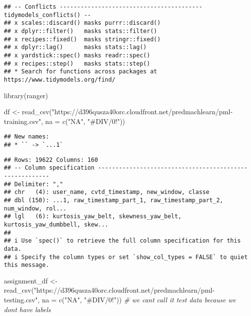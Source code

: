 \documentclass[
]{article}
\newenvironment{Shaded}{\begin{snugshade}}{\end{snugshade}}
\newcommand{\AttributeTok}[1]{\textcolor[rgb]{0.77,0.63,0.00}{#1}}
\newcommand{\CommentTok}[1]{\textcolor[rgb]{0.56,0.35,0.01}{\textit{#1}}}
\newcommand{\FunctionTok}[1]{\textcolor[rgb]{0.00,0.00,0.00}{#1}}
\newcommand{\NormalTok}[1]{#1}
\newcommand{\OtherTok}[1]{\textcolor[rgb]{0.56,0.35,0.01}{#1}}
\newcommand{\StringTok}[1]{\textcolor[rgb]{0.31,0.60,0.02}{#1}}
\begin{document}
\begin{verbatim}
## -- Conflicts ----------------------------------------- tidymodels_conflicts() --
## x scales::discard() masks purrr::discard()
## x dplyr::filter()   masks stats::filter()
## x recipes::fixed()  masks stringr::fixed()
## x dplyr::lag()      masks stats::lag()
## x yardstick::spec() masks readr::spec()
## x recipes::step()   masks stats::step()
## * Search for functions across packages at https://www.tidymodels.org/find/
\end{verbatim}

\begin{Shaded}
\begin{Highlighting}[]
\FunctionTok{library}\NormalTok{(ranger)}

\NormalTok{df }\OtherTok{\textless{}{-}} \FunctionTok{read\_csv}\NormalTok{(}\StringTok{"https://d396qusza40orc.cloudfront.net/predmachlearn/pml{-}training.csv"}\NormalTok{, }\AttributeTok{na =} \FunctionTok{c}\NormalTok{(}\StringTok{"NA"}\NormalTok{, }\StringTok{"\#DIV/0!"}\NormalTok{))}
\end{Highlighting}
\end{Shaded}

\begin{verbatim}
## New names:
## * `` -> `...1`
\end{verbatim}

\begin{verbatim}
## Rows: 19622 Columns: 160
## -- Column specification --------------------------------------------------------
## Delimiter: ","
## chr   (4): user_name, cvtd_timestamp, new_window, classe
## dbl (150): ...1, raw_timestamp_part_1, raw_timestamp_part_2, num_window, rol...
## lgl   (6): kurtosis_yaw_belt, skewness_yaw_belt, kurtosis_yaw_dumbbell, skew...
## 
## i Use `spec()` to retrieve the full column specification for this data.
## i Specify the column types or set `show_col_types = FALSE` to quiet this message.
\end{verbatim}

\begin{Shaded}
\begin{Highlighting}[]
\NormalTok{assignment\_df }\OtherTok{\textless{}{-}} \FunctionTok{read\_csv}\NormalTok{(}\StringTok{"https://d396qusza40orc.cloudfront.net/predmachlearn/pml{-}testing.csv"}\NormalTok{, }\AttributeTok{na =} \FunctionTok{c}\NormalTok{(}\StringTok{"NA"}\NormalTok{, }\StringTok{"\#DIV/0!"}\NormalTok{)) }\CommentTok{\# we can\textquotesingle{}t call it test data because we don\textquotesingle{}t have labels}
\end{Highlighting}
\end{Shaded}
\end{document}
